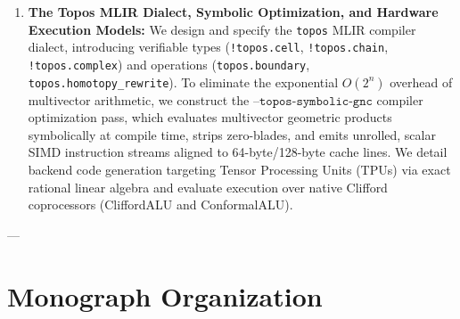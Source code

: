 \begin{enumerate}[leftmargin=1.2cm]
    \item \textbf{The Topos MLIR Dialect, Symbolic Optimization, and Hardware Execution Models:}  
    We design and specify the \texttt{topos} MLIR compiler dialect, introducing verifiable types (\texttt{!topos.cell}, \texttt{!topos.chain}, \texttt{!topos.complex}) and operations (\texttt{topos.boundary}, \texttt{topos.homotopy\_rewrite}). To eliminate the exponential $O(2^n)$ overhead of multivector arithmetic, we construct the $\texttt{--topos-symbolic-gnc}$ compiler optimization pass, which evaluates multivector geometric products symbolically at compile time, strips zero-blades, and emits unrolled, scalar SIMD instruction streams aligned to 64-byte/128-byte cache lines. We detail backend code generation targeting Tensor Processing Units (TPUs) via exact rational linear algebra and evaluate execution over native Clifford coprocessors (CliffordALU and ConformalALU).
\end{enumerate}

---

\section{Monograph Organization}
\label{sec:org}

